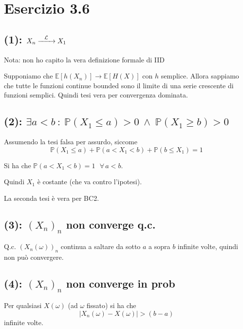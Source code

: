 \documentclass{article}
\newcommand{\myrightarrow}[1]{\xrightarrow{\makebox[2em][c]{$\scriptstyle#1$}}}
\newcommand{\convlegge}{\myrightarrow{\mathcal{L}}}
\begin{document}
\section{Esercizio 3.6}
\subsection{(1): $X_n \convlegge X_1$}
Nota: non ho capito la vera definizione formale di IID

Supponiamo che $\mathbb{E}\left[h(X_n)\right] \longrightarrow \mathbb{E}\left[H(X)\right]$ con $h$ semplice. Allora sappiamo che tutte le funzioni continue bounded sono il limite di una serie crescente di funzioni semplici. Quindi tesi vera per convergenza dominata.


\subsection{(2): $\exists  a<b \ : \ \mathbb{P}\left(X_1\leq a\right) > 0 \ \land  \ \mathbb{P}\left(X_1\geq b\right) > 0$}
Assumendo la tesi falsa per assurdo, siccome
\[
	\mathbb{P}\left(X_1\leq a\right) + \mathbb{P}\left(a < X_1 < b\right) + \mathbb{P}\left(b\leq X_1\right) = 1
\]

Si ha che $\mathbb{P}\left(a < X_1 < b\right) = 1\ \ \ \forall\, a<b$.

Quindi $X_1$ è costante (che va contro l'ipotesi).

La seconda tesi è vera per BC2.

\subsection{(3): $\left(X_n\right)_n$ non converge q.c.}
Q.c. $\left(X_n (\omega )\right)_n$ continua a saltare da sotto $a$ a sopra $b$ infinite volte, quindi non può convergere.

\subsection{(4): $\left(X_n\right)_n$ non converge in prob}
Per qualsiasi $X(\omega )$ (ad $\omega $ fissato) si ha che 
\[
	\left|X_n(\omega ) - X\left(\omega \right)\right| > \left(b-a\right)
\]
infinite volte.
\end{document}
